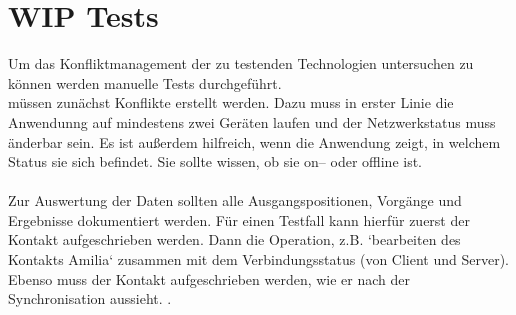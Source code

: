 \section{WIP Tests}
Um das Konfliktmanagement der zu testenden Technologien untersuchen zu können werden manuelle Tests durchgeführt.\\

 müssen zunächst Konflikte erstellt werden. Dazu muss in erster Linie die Anwendunng auf mindestens zwei Geräten laufen und der Netzwerkstatus muss änderbar sein. Es ist außerdem hilfreich, wenn die Anwendung zeigt, in welchem Status sie sich befindet. Sie sollte wissen, ob sie on-- oder offline ist.\\
\\
Zur Auswertung der Daten sollten alle Ausgangspositionen, Vorgänge und Ergebnisse dokumentiert werden. Für einen Testfall kann hierfür zuerst der Kontakt aufgeschrieben werden. Dann die Operation, z.B. `bearbeiten des Kontakts Amilia` zusammen mit dem Verbindungsstatus (von Client und Server). Ebenso muss der Kontakt aufgeschrieben werden, wie er nach der Synchronisation aussieht. 
.
